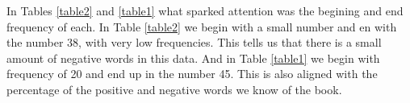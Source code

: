 \documentclass{article}
\begin{document}
In Tables \ref{table2} and \ref{table1} what sparked attention was the begining and end frequency of each. In Table \ref{table2} we begin with a small number and en with the number 38, with very low frequencies. This tells us that there is a small amount of negative words in this data. And in Table \ref{table1} we begin with frequency of 20 and end up in the number 45. This is also aligned with the percentage of the positive and negative words we know of the book.\\







 
\end{document}

